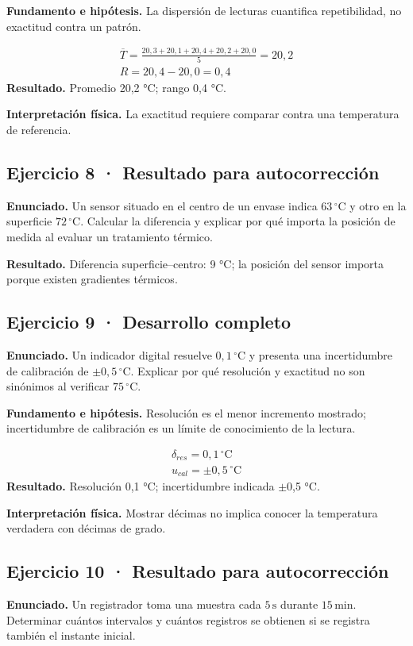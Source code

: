 \documentclass[11pt,a4paper]{article}
\begin{document}
\textbf{Fundamento e hipótesis.} La dispersión de lecturas cuantifica repetibilidad, no exactitud contra un patrón.

\[
\begin{gathered}
\overline T=\frac{20{,}3+20{,}1+20{,}4+20{,}2+20{,}0}{5}=20{,}2\\R=20{,}4-20{,}0=0{,}4
\end{gathered}
\]
\textbf{Resultado.} Promedio 20,2 °C; rango 0,4 °C.

\textbf{Interpretación física.} La exactitud requiere comparar contra una temperatura de referencia.


\subsection*{Ejercicio 8 · Resultado para autocorrección}
\textbf{Enunciado.} Un sensor situado en el centro de un envase indica \(63\,^\circ\mathrm C\) y otro en la superficie \(72\,^\circ\mathrm C\). Calcular la diferencia y explicar por qué importa la posición de medida al evaluar un tratamiento térmico.

\textbf{Resultado.} Diferencia superficie–centro: 9 °C; la posición del sensor importa porque existen gradientes térmicos.


\subsection*{Ejercicio 9 · Desarrollo completo}
\textbf{Enunciado.} Un indicador digital resuelve \(0{,}1\,^\circ\mathrm C\) y presenta una incertidumbre de calibración de \(\pm0{,}5\,^\circ\mathrm C\). Explicar por qué resolución y exactitud no son sinónimos al verificar \(75\,^\circ\mathrm C\).

\textbf{Fundamento e hipótesis.} Resolución es el menor incremento mostrado; incertidumbre de calibración es un límite de conocimiento de la lectura.

\[
\begin{gathered}
\delta_{res}=0{,}1\,^{\circ}\mathrm C\\u_{cal}=\pm0{,}5\,^{\circ}\mathrm C
\end{gathered}
\]
\textbf{Resultado.} Resolución 0,1 °C; incertidumbre indicada \ensuremath{\pm}0,5 °C.

\textbf{Interpretación física.} Mostrar décimas no implica conocer la temperatura verdadera con décimas de grado.


\subsection*{Ejercicio 10 · Resultado para autocorrección}
\textbf{Enunciado.} Un registrador toma una muestra cada \(5\,\mathrm s\) durante \(15\,\mathrm{min}\). Determinar cuántos intervalos y cuántos registros se obtienen si se registra también el instante inicial.
\end{document}
